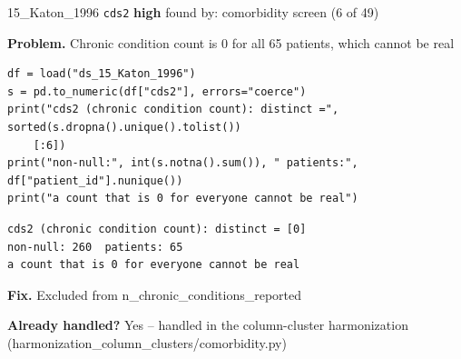 \documentclass[9pt, t, handout]{beamer}
\newcommand{\ans}[1]{\textcolor{structure.fg}{#1}}
\begin{document}
\begin{frame}[fragile]{15\_Katon\_1996 \quad \texttt{cds2}}
  {\scriptsize\textcolor{orange!80!black}{\textbf{high}} \quad
   found by: comorbidity screen \quad (6 of 49)}
  \vspace{3pt}

  {\footnotesize \textbf{Problem.} Chronic condition count is 0 for all 65 patients, which cannot be real}
  \vspace{4pt}

  \begin{Verbatim}[fontsize=\tiny, frame=single, framesep=2pt, label=\tiny reproduce]
df = load("ds_15_Katon_1996")
s = pd.to_numeric(df["cds2"], errors="coerce")
print("cds2 (chronic condition count): distinct =", sorted(s.dropna().unique().tolist())
    [:6])
print("non-null:", int(s.notna().sum()), " patients:", df["patient_id"].nunique())
print("a count that is 0 for everyone cannot be real")
  \end{Verbatim}
  \begin{Verbatim}[fontsize=\tiny, frame=single, framesep=2pt, label=\tiny output]
cds2 (chronic condition count): distinct = [0]
non-null: 260  patients: 65
a count that is 0 for everyone cannot be real
  \end{Verbatim}
  \vspace{2pt}

  {\footnotesize \textbf{Fix.} Excluded from n\_chronic\_conditions\_reported}
  \vspace{2pt}

  {\footnotesize \textbf{Already handled?} \ans{Yes} -- handled in the column-cluster harmonization
   (harmonization\_column\_clusters/comorbidity.py)}
\end{frame}
\end{document}
